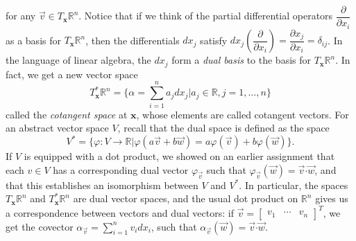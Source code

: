 \documentclass[12pt,letterpaper]{article}
\newcommand{\R}{\mathbb{R}}
\newcommand{\x}{\mathbf{x}}
\newcommand{\dotp}{\boldsymbol{\cdot}}
\begin{document}
for any $\vec{v}\in T_\x\R^n$. Notice that if we think of the partial differential operators $\dfrac{\partial}{\partial x_i}$ as a basis for $T_\x \R^n$, then the differentials $dx_j$ satisfy $dx_j(\dfrac{\partial}{\partial x_i}) = \dfrac{\partial x_j}{\partial x_i}=\delta_{ij}$. In the language of linear algebra, the $dx_j$ form a {\em dual basis} to the basis for $T_\x\R^n$. In fact, we get a new vector space
\[
 T^*_\x \R^n = \{\alpha = \sum_{i=1}^n a_j dx_j| a_j\in\R, j=1,\ldots, n\}
\]
called the {\em cotangent space} at $\x$, whose elements are called cotangent vectors. For an abstract vector space $V$, recall that the dual space is defined as the space 
\[
V^* = \{\varphi:V\to \R|\varphi(a\vec{v}+b\vec{w}) = a\varphi(\vec{v})+b\varphi(\vec{w})\}.
\]
If $V$ is equipped with a dot product, we showed on an earlier assignment that each $v\in V$ has a corresponding dual vector $\varphi_{\vec{v}}$ such that $\varphi_{\vec{v}}(\vec{w}) = \vec{v}\dotp\vec{w}$, and that this establishes an isomorphism between $V$ and $V^*$. In particular, the spaces $T_\x\R^n$ and $T^*_\x\R^n$ are dual vector spaces, and the usual dot product on $\R^n$ gives us a correspondence between vectors and dual vectors: if $\vec{v} = \begin{bmatrix} v_1& \cdots & v_n\end{bmatrix}^T$, we get the covector $\alpha_{\vec{v}}=\sum_{i=1}^n v_idx_i$, such that $\alpha_{\vec{v}}(\vec{w}) = \vec{v}\dotp\vec{w}$.
\end{document}

